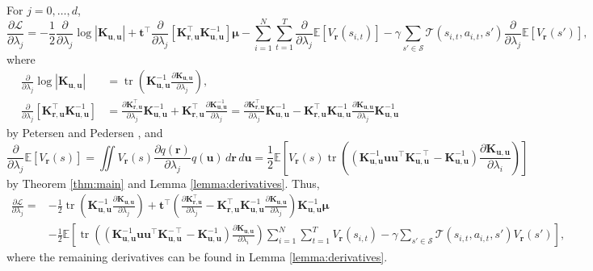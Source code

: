 \documentclass{article}
\theoremstyle{definition}
\theoremstyle{remark}
\DeclareMathOperator{\tr}{tr}
\newcommand{\Kuu}{\mathbf{K}_{\mathbf{u},\mathbf{u}}}
\newcommand{\Kru}{\mathbf{K}_{\mathbf{r},\mathbf{u}}}
\newcommand{\V}{V_{\mathbf{r}}}
\newcommand{\dlj}{\frac{\partial}{\partial \lambda_j}}
\newcommand{\dx}{\,d\mathbf{r}\,d\mathbf{u}}
\begin{document}
For $j = 0, \dots, d$,
\[
  \frac{\partial \mathcal{L}}{\partial \lambda_j} = - \frac{1}{2}\dlj\log|\Kuu|
  + \mathbf{t}^\intercal\dlj \left[ \Kru^\intercal\Kuu^{-1} \right] \bm\mu -
  \sum_{i=1}^N \sum_{t=1}^T \dlj\mathbb{E}[\V(s_{i,t})] -
  \gamma\sum_{s' \in \mathcal{S}} \mathcal{T}(s_{i,t}, a_{i,t},
  s')\dlj\mathbb{E}[\V(s')],
\]
where
\begin{align*}
  \dlj\log|\Kuu| &= \tr \left( \Kuu^{-1} \frac{\partial \Kuu}{\partial \lambda_j}
  \right), \\
  \dlj \left[ \Kru^\intercal\Kuu^{-1} \right] &= \frac{\partial
    \Kru^\intercal}{\partial \lambda_j} \Kuu^{-1} + \Kru^\intercal
  \frac{\partial \Kuu^{-1}}{\partial \lambda_j} = \frac{\partial
    \Kru^\intercal}{\partial \lambda_j} \Kuu^{-1} -
  \Kru^\intercal\Kuu^{-1}\frac{\partial \Kuu}{\partial \lambda_j}\Kuu^{-1}
\end{align*}
by Petersen and Pedersen \cite{petersen2008matrix}, and
\[
  \dlj \mathbb{E}[\V(s)] = \iint\V(s)\frac{\partial q(\mathbf{r})}{\partial
    \lambda_j}q(\mathbf{u})\dx = \frac{1}{2}\mathbb{E} \left[ \V(s) \tr
    \left((\Kuu^{-1}\mathbf{u}\mathbf{u}^\intercal\Kuu^{-\intercal} - \Kuu^{-1})
      \frac{\partial \Kuu}{\partial \lambda_i} \right) \right]
\]
by Theorem \ref{thm:main} and Lemma \ref{lemma:derivatives}. Thus,
\[
  \begin{split}
    \frac{\partial \mathcal{L}}{\partial \lambda_j} = &- \frac{1}{2} \tr
    \left(\Kuu^{-1} \frac{\partial \Kuu}{\partial \lambda_j} \right) +
    \mathbf{t}^\intercal \left( \frac{\partial \Kru^\intercal}{\partial
        \lambda_j} - \Kru^\intercal\Kuu^{-1}\frac{\partial
        \Kuu}{\partial \lambda_j} \right) \Kuu^{-1} \bm\mu \\
    &- \frac{1}{2} \mathbb{E} \left[ \tr \left(
        (\Kuu^{-1}\mathbf{u}\mathbf{u}^\intercal\Kuu^{-\intercal} - \Kuu^{-1})
        \frac{\partial \Kuu}{\partial \lambda_i} \right) \sum_{i=1}^N
      \sum_{t=1}^T \V(s_{i,t}) - \gamma\sum_{s' \in \mathcal{S}}
      \mathcal{T}(s_{i,t}, a_{i,t}, s') \V(s') \right],
  \end{split}
\]
where the remaining derivatives can be found in Lemma \ref{lemma:derivatives}.



\end{document}

